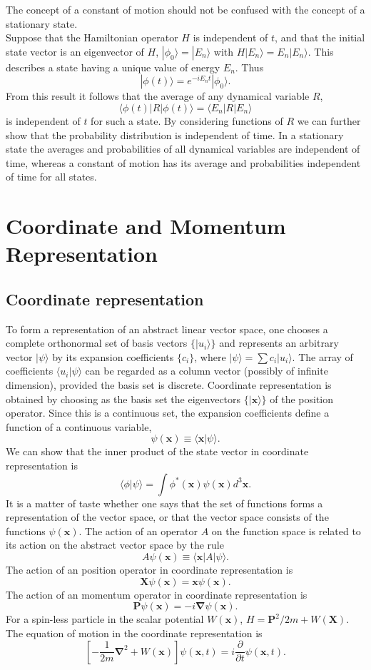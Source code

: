 \begin{note}
The concept of a constant of motion should not be confused with the
concept of a stationary state. \\
Suppose that the Hamiltonian operator $H$ is independent of $t$, and that the initial state vector is an eigenvector of $H$, $|\phi_0\rangle = | E_n \rangle$ with $H |E_n\rangle = E_n | E_n \rangle$. This describes a state having a unique value of energy $E_n$. Thus
\[|\phi(t)\rangle = e^{-iE_nt} |\phi_0\rangle.\]
From this result it follows that the average of any dynamical variable $R$,
\[\langle \phi(t) | R | \phi(t) \rangle = \langle E_n | R | E_n \rangle \]
is independent of $t$ for such a state. By considering functions of $R$ we can further show that the probability distribution is independent of time. In a stationary state the averages and probabilities of all dynamical variables are independent of time, whereas a constant of motion has its average and probabilities independent of time for all states.
\end{note}

\chapter{Coordinate and Momentum Representation}
\section{Coordinate representation}
To form a representation of an abstract linear vector space, one chooses a complete orthonormal set of basis vectors $\{|u_i\rangle\}$ and represents an arbitrary vector $|\psi\rangle$ by its expansion coefficients $\{c_i\}$, where $|\psi\rangle = \sum c_i |u_i\rangle$. 
The array of coefficients $\langle u_i | \psi \rangle$ can be regarded as a column vector (possibly of infinite dimension), provided the basis set is discrete.
Coordinate representation is obtained by choosing as the basis set the eigenvectors $\{|\bm{x}\rangle\}$ of the position operator. 
Since this is a continuous set, the expansion coefficients define a function of a continuous variable,
\[\psi(\bm{x})  \equiv \langle \bm{x} | \psi \rangle.\]
We can show that the inner product of the state vector in coordinate representation is
\[\langle \phi | \psi \rangle = \int \phi^{*}(\bm{x})\psi(\bm{x}) d^3\bm{x} .\]
It is a matter of taste whether one says that the set of functions forms a representation of the vector space, or that the vector space consists of the functions $\psi(\bm{x})$.
The action of an operator $A$ on the function space is related to its action on the abstract vector space by the rule
\[A \psi(\bm{x}) \equiv  \langle \bm{x} |A| \psi \rangle.\]
The action of an position operator in coordinate representation is
\[\bm{X}\psi(\bm{x}) = \bm{x} \psi(\bm{x}).\]
The action of an momentum operator in coordinate representation is
\[\bm{P}\psi(\bm{x}) = -i \bm{\nabla}\psi(\bm{x}).\]
For a spin-less particle in the scalar potential $W(\bm{x})$,
$H = {\bm{P}^2}/2m + W(\bm{X})$. 
The equation of motion in the coordinate representation is
\[ \left[- \frac{1}{2m} \bm{\nabla}^2 + W(\bm{x}) \right] \psi(\bm{x},t) = i\frac{\partial}{\partial t}\psi(\bm{x},t).\]


